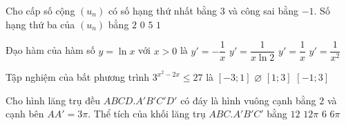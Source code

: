 \caulc
\begin{ex}%
	Cho cấp số cộng $(u_n)$ có số hạng thứ nhất bằng $3$ và công sai bằng $-1$. Số hạng thứ ba của $(u_n)$ bằng
	\choice
	{$2$}
	{$0$}
	{$5$}
	{\True $1$}
\end{ex}

\begin{ex}%
	Đạo hàm của hàm số $y = \ln x$ với $x > 0$ là
	\choice
	{$y' = -\dfrac{1}{x}$}
	{$y' = \dfrac{1}{x \ln 2}$}
	{\True $y' = \dfrac{1}{x}$}
	{$y' = \dfrac{1}{x^2}$}
\end{ex}

\begin{ex}%
	Tập nghiệm của bất phương trình $3^{x^2-2x} \le 27$ là
	\choice
	{$[-3;1]$}
	{$\varnothing$}
	{$[1;3]$}
	{\True $[-1;3]$}
\end{ex}

\begin{ex}%
	Cho hình lăng trụ đều $ABCD.A'B'C'D'$ có đáy là hình vuông cạnh bằng $2$ và cạnh bên $AA'=3\pi$. Thể tích của khối lăng trụ $ABC.A'B'C'$ bằng
	\choice
	{$12$}
	{$12\pi$}
	{$6$}
	{\True $6\pi$}
\end{ex}

